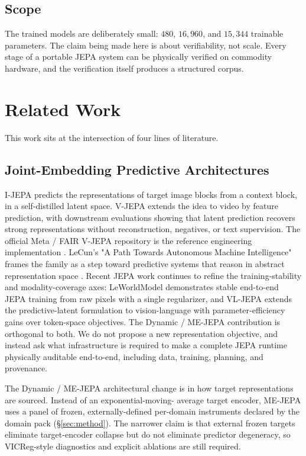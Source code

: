 \documentclass[10pt,twocolumn,letterpaper]{article}
\begin{document}
\subsection{Scope}

The trained models are deliberately small: $480$, $16{,}960$, and
$15{,}344$ trainable parameters. The claim being made here is
about verifiability, not scale. Every stage of a portable JEPA
system can be physically verified on commodity hardware, and the
verification itself produces a structured corpus.

\section{Related Work}
\label{sec:related}

This work sits at the intersection of four lines of literature.

\subsection{Joint-Embedding Predictive Architectures}

I-JEPA \cite{assran2023ijepa} predicts the representations of
target image blocks from a context block, in a self-distilled
latent space. V-JEPA \cite{bardes2024vjepa} extends the idea to
video by feature prediction, with downstream evaluations showing
that latent prediction recovers strong representations without
reconstruction, negatives, or text supervision. The official Meta /
FAIR V-JEPA repository is the reference engineering implementation
\cite{metafair2024vjepa}. LeCun's "A Path Towards Autonomous
Machine Intelligence" frames the family as a step toward
predictive systems that reason in abstract representation space
\cite{lecun2022path}. Recent JEPA work continues to refine the
training-stability and modality-coverage axes: LeWorldModel
\cite{maes2026leworldmodel} demonstrates stable end-to-end
JEPA training from raw pixels with a single regularizer, and
VL-JEPA \cite{chen2026vljepa} extends the predictive-latent
formulation to vision-language with parameter-efficiency gains
over token-space objectives. The Dynamic / ME-JEPA contribution is
orthogonal to both. We do not propose a new representation
objective, and instead ask what infrastructure is required to make
a complete JEPA runtime physically auditable end-to-end, including
data, training, planning, and provenance.

The Dynamic / ME-JEPA architectural change is in how target
representations are sourced. Instead of an exponential-moving-
average target encoder, ME-JEPA uses a panel of frozen,
externally-defined per-domain instruments declared by the domain
pack (\S\ref{sec:method}). The narrower claim is that external
frozen targets eliminate target-encoder collapse but do not
eliminate predictor degeneracy, so VICReg-style diagnostics
\cite{bardes2022vicreg} and explicit ablations are still
required.
\end{document}
